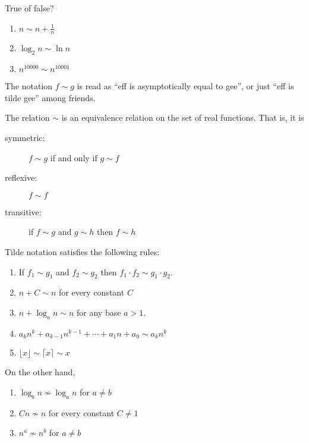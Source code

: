 \documentclass{tstextbook}
\begin{document}
\begin{exercise}
  True of false?
  \begin{enumerate}
    \item
      $n\sim n+ \frac{1}{n}$
    \item
  $\log_2 n\sim \ln n$
    \item
      $n^{10000} \sim  n^{10001}$
  \end{enumerate}
\end{exercise}


The notation \(f \sim g\) is read as “eff is asymptotically equal to gee”, or just “eff is tilde gee” among friends.

\begin{theorem}[as a relation]
  The relation \(\sim\) is an equivalence relation on the set of real functions.
  That is, it is
  \begin{description}
  \item[symmetric:] \( f\sim g \) if and only if \( g\sim f\)
  \item[reflexive:] \( f\sim f\)
  \item[transitive:] if \( f\sim g \) and \(g\sim h\) then \(f\sim h\)
  \end{description}
\end{theorem}

\begin{theorem}[Rules]
  \label{prop: tilde rules}
  Tilde notation satisfies the following rules:
  \begin{enumerate}
    \item If \(f_1\sim g_1\) and \(f_2 \sim g_2\) then \(f_1 \cdot f_2 \sim g_1 \cdot g_2\).
    \item \(n +C\sim n\) for every constant \(C\)
    \item \(n + \log_a n\sim n\) for any base $a>1$.
    \item \label{item: tilde polynomial}
      \(a_k n^k + a_{k-1} n^{k-1} + \cdots + a_1 n + a_0 \sim a_k n^k\)
    \item \(\lfloor x \rfloor \sim \lceil x \rceil \sim x\)
  \end{enumerate}
\end{theorem}


\begin{remark}
  On the other hand,
\begin{enumerate}
  \item $\log_b n \not\sim \log_a n$ for $a\neq b$
  \item $C  n \not\sim n$ for every constant $C\neq 1$
  \item $n^a \not\sim n^b$ for $a\neq b$
\end{enumerate}
\end{remark}
\end{document}

